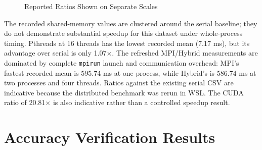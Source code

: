\documentclass[12pt,a4paper]{report}
\begin{document}
\begin{figure}[H]
\begin{minipage}{0.31\textwidth}
    \end{minipage}\hfill
    \begin{minipage}{0.31\textwidth}
        \centering
    \end{minipage}
    \caption{Reported Ratios Shown on Separate Scales}
\end{figure}

The recorded shared-memory values are clustered around the serial baseline; they do not
demonstrate substantial speedup for this dataset under whole-process timing. Pthreads at
16 threads has the lowest recorded mean (7.17 ms), but its advantage over serial is only
1.07$\times$. The refreshed MPI/Hybrid measurements are dominated by complete
\texttt{mpirun} launch and communication overhead: MPI's fastest recorded mean is
595.74 ms at one process, while Hybrid's is 586.74 ms at two processes and four threads.
Ratios against the existing serial CSV are indicative because the distributed benchmark was
rerun in WSL. The CUDA ratio of 20.81$\times$ is also indicative rather than a controlled
speedup result.

\section{Accuracy Verification Results}
\end{document}
